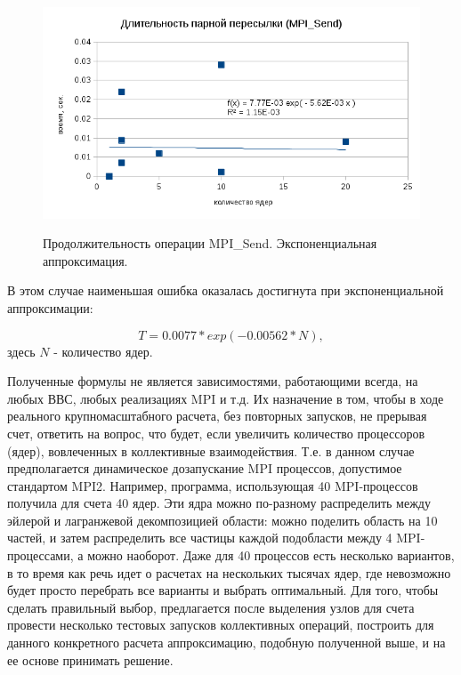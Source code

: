          
         
         \begin{figure}[htb]
         	\begin{center}
         		\includegraphics[height=7cm,keepaspectratio]{images/RomanenkoAASnytnikovAVChernykhIGadaptationtosupercomputerfinalEXTENDEDREFERENCES-img7.png}
         	\end{center}
         	\caption{Продолжительность операции MPI\_Send. Экспоненциальная аппроксимация.}
         	\label{send_exp_appr}
         \end{figure} 
         
        В этом случае наименьшая ошибка оказалась достигнута при экспоненциальной аппроксимации:
        
        $$
        T = 0.0077*exp(-0.00562*N),
        $$
         здесь $N$ - количество ядер.
                 
        Полученные формулы не является зависимостями, работающими всегда, на любых ВВС, любых реализациях MPI и т.д. Их назначение в том, чтобы в ходе реального крупномасштабного расчета, без повторных запусков, не прерывая счет, ответить на вопрос, что будет, если увеличить количество процессоров (ядер), вовлеченных в коллективные взаимодействия. Т.е. в данном случае предполагается динамическое дозапускание MPI процессов, допустимое стандартом MPI2.
        Например, программа, использующая 40 MPI-процессов  получила для счета 40 ядер. Эти ядра можно по-разному распределить между эйлерой и лагранжевой декомпозицией области: можно поделить область на 10 частей, и затем распределить все частицы каждой подобласти между  4 MPI-процессами, а можно наоборот. Даже для 40 процессов есть несколько вариантов, в то время как речь идет о расчетах на нескольких тысячах ядер, где невозможно будет просто перебрать все варианты и выбрать оптимальный.
        Для того, чтобы сделать правильный выбор, предлагается после выделения узлов для счета провести несколько тестовых запусков коллективных операций, построить для данного конкретного расчета аппроксимацию, подобную полученной выше, и на ее основе принимать решение.
        

